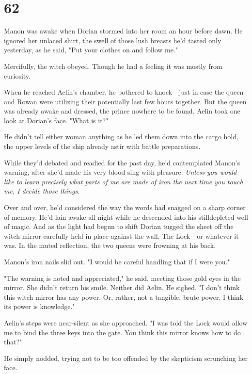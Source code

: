 
\chapter{62}

Manon was awake when Dorian stormed into her room an hour before dawn.
He ignored her unlaced shirt, the swell of those lush breasts he'd tasted only yesterday, as he said, "Put your clothes on and follow me."

Mercifully, the witch obeyed.
Though he had a feeling it was mostly from curiosity.

When he reached Aelin's chamber, he bothered to knock---just in case the queen and Rowan were utilizing their potentially last few hours together.
But the queen was already awake and dressed, the prince nowhere to be found.
Aelin took one look at Dorian's face.
"What is it?"

He didn't tell either woman anything as he led them down into the cargo hold, the upper levels of the ship already astir with battle preparations.

While they'd debated and readied for the past day, he'd contemplated Manon's warning, after she'd made his very blood sing with pleasure.
\emph{Unless you would like to learn precisely what parts of me are made of iron the next time you touch me, I decide those things.}

Over and over, he'd considered the way the words had snagged on a sharp corner of memory.
He'd lain awake all night while he descended into his stilldepleted well of magic.
And as the light had begun to shift 
Dorian tugged the sheet off the witch mirror carefully held in place against the wall.
The Lock---or whatever it was.
In the muted reflection, the two queens were frowning at his back.

Manon's iron nails slid out.
"I would be careful handling that if I were you."

"The warning is noted and appreciated," he said, meeting those gold eyes in the mirror.
She didn't return his smile.
Neither did Aelin.
He sighed.
"I don't think this witch mirror has any power.
Or, rather, not a tangible, brute power.
I think its power is knowledge."

Aelin's steps were near-silent as she approached.
"I was told the Lock would allow me to bind the three keys into the gate.
You think this mirror knows how to do that?"

He simply nodded, trying not to be too offended by the skepticism scrunching her face.

